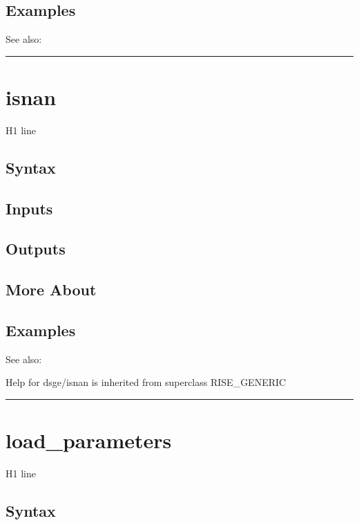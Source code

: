 \documentclass[letterpaper,10pt,english]{sphinxmanual}
\begin{document}
\subsection{Examples}
\label{classes/models/@dsge/dsge:id79}
See also:


\bigskip\hrule{}\bigskip



\section{isnan}
\label{classes/models/@dsge/dsge:isnan}\label{classes/models/@dsge/dsge:id80}
H1 line


\subsection{Syntax}
\label{classes/models/@dsge/dsge:id81}

\subsection{Inputs}
\label{classes/models/@dsge/dsge:id82}

\subsection{Outputs}
\label{classes/models/@dsge/dsge:id83}

\subsection{More About}
\label{classes/models/@dsge/dsge:id84}

\subsection{Examples}
\label{classes/models/@dsge/dsge:id85}
See also:

Help for dsge/isnan is inherited from superclass RISE\_GENERIC


\bigskip\hrule{}\bigskip



\section{load\_parameters}
\label{classes/models/@dsge/dsge:id86}\label{classes/models/@dsge/dsge:load-parameters}
H1 line


\subsection{Syntax}
\label{classes/models/@dsge/dsge:id87}
\end{document}
